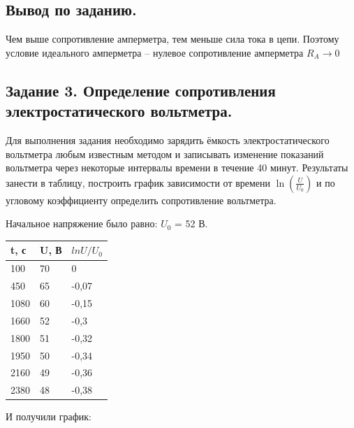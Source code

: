 \documentclass[a4paper,12pt]{article}
\begin{document}
\subsection{Вывод по заданию.}
\hspace{\parindent}Чем выше сопротивление амперметра, тем меньше сила тока в цепи. Поэтому условие
идеального амперметра – нулевое сопротивление амперметра $R_A \xrightarrow{} 0$ 

\newpage

\subsection{Задание 3. Определение сопротивления электростатического
вольтметра.}

\hspace{\parindent}Для выполнения задания необходимо зарядить ёмкость
электростатического вольтметра любым известным методом и записывать
изменение показаний вольтметра через некоторые интервалы времени в
течение 40 минут. Результаты занести в таблицу, построить график
зависимости от времени $\ln(\frac{U}{U_0})$ и по угловому коэффициенту определить
сопротивление вольтметра.

Начальное напряжение было равно: $U_0$ = 52 В.

\begin{table}[!ht]
    \centering
    \begin{tabular}{|l|l|l|}
    \hline
        t, с & U, В & $lnU/U_0$ \\ \hline
        100 & 70 & 0 \\ \hline
        450 & 65 & -0,07 \\ \hline
        1080 & 60 & -0,15 \\ \hline
        1660 & 52 & -0,3 \\ \hline
        1800 & 51 & -0,32 \\ \hline
        1950 & 50 & -0,34 \\ \hline
        2160 & 49 & -0,36 \\ \hline
        2380 & 48 & -0,38 \\ \hline
    \end{tabular}
\end{table}

И получили график:
\end{document}
